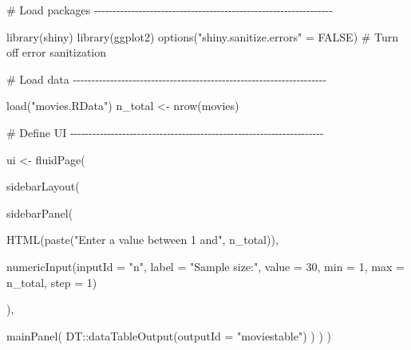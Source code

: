 \documentclass[
  letterpaper,
  DIV=11,
  numbers=noendperiod]{scrreprt}
\newenvironment{Shaded}{\begin{snugshade}}{\end{snugshade}}
\newcommand{\AttributeTok}[1]{\textcolor[rgb]{0.40,0.46,0.14}{#1}}
\newcommand{\CommentTok}[1]{\textcolor[rgb]{0.37,0.37,0.37}{#1}}
\newcommand{\ConstantTok}[1]{\textcolor[rgb]{0.56,0.35,0.01}{#1}}
\newcommand{\DecValTok}[1]{\textcolor[rgb]{0.68,0.00,0.00}{#1}}
\newcommand{\FunctionTok}[1]{\textcolor[rgb]{0.28,0.35,0.67}{#1}}
\newcommand{\NormalTok}[1]{\textcolor[rgb]{0.00,0.46,0.62}{#1}}
\newcommand{\OtherTok}[1]{\textcolor[rgb]{0.00,0.46,0.62}{#1}}
\newcommand{\SpecialCharTok}[1]{\textcolor[rgb]{0.37,0.37,0.37}{#1}}
\newcommand{\StringTok}[1]{\textcolor[rgb]{0.13,0.47,0.30}{#1}}
\begin{document}
\begin{Shaded}
\begin{Highlighting}[]
\CommentTok{\# Load packages {-}{-}{-}{-}{-}{-}{-}{-}{-}{-}{-}{-}{-}{-}{-}{-}{-}{-}{-}{-}{-}{-}{-}{-}{-}{-}{-}{-}{-}{-}{-}{-}{-}{-}{-}{-}{-}{-}{-}{-}{-}{-}{-}{-}{-}{-}{-}{-}{-}{-}{-}{-}{-}{-}{-}{-}{-}{-}{-}{-}{-}{-}{-}{-}}

\FunctionTok{library}\NormalTok{(shiny)}
\FunctionTok{library}\NormalTok{(ggplot2)}
\FunctionTok{options}\NormalTok{(}\StringTok{"shiny.sanitize.errors"} \OtherTok{=} \ConstantTok{FALSE}\NormalTok{) }\CommentTok{\# Turn off error sanitization}

\CommentTok{\# Load data {-}{-}{-}{-}{-}{-}{-}{-}{-}{-}{-}{-}{-}{-}{-}{-}{-}{-}{-}{-}{-}{-}{-}{-}{-}{-}{-}{-}{-}{-}{-}{-}{-}{-}{-}{-}{-}{-}{-}{-}{-}{-}{-}{-}{-}{-}{-}{-}{-}{-}{-}{-}{-}{-}{-}{-}{-}{-}{-}{-}{-}{-}{-}{-}{-}{-}{-}{-}}

\FunctionTok{load}\NormalTok{(}\StringTok{"movies.RData"}\NormalTok{)}
\NormalTok{n\_total }\OtherTok{\textless{}{-}} \FunctionTok{nrow}\NormalTok{(movies)}

\CommentTok{\# Define UI {-}{-}{-}{-}{-}{-}{-}{-}{-}{-}{-}{-}{-}{-}{-}{-}{-}{-}{-}{-}{-}{-}{-}{-}{-}{-}{-}{-}{-}{-}{-}{-}{-}{-}{-}{-}{-}{-}{-}{-}{-}{-}{-}{-}{-}{-}{-}{-}{-}{-}{-}{-}{-}{-}{-}{-}{-}{-}{-}{-}{-}{-}{-}{-}{-}{-}{-}{-}}

\NormalTok{ui }\OtherTok{\textless{}{-}} \FunctionTok{fluidPage}\NormalTok{(}
  
  \FunctionTok{sidebarLayout}\NormalTok{(}
    
    \FunctionTok{sidebarPanel}\NormalTok{(}
      
      \FunctionTok{HTML}\NormalTok{(}\FunctionTok{paste}\NormalTok{(}\StringTok{"Enter a value between 1 and"}\NormalTok{, n\_total)),}
      
      \FunctionTok{numericInput}\NormalTok{(}\AttributeTok{inputId =} \StringTok{"n"}\NormalTok{,}
                   \AttributeTok{label =} \StringTok{"Sample size:"}\NormalTok{,}
                   \AttributeTok{value =} \DecValTok{30}\NormalTok{,}
                   \AttributeTok{min =} \DecValTok{1}\NormalTok{, }\AttributeTok{max =}\NormalTok{ n\_total,}
                   \AttributeTok{step =} \DecValTok{1}\NormalTok{)}
      
\NormalTok{    ),}
    
    \FunctionTok{mainPanel}\NormalTok{(}
\NormalTok{      DT}\SpecialCharTok{::}\FunctionTok{dataTableOutput}\NormalTok{(}\AttributeTok{outputId =} \StringTok{"moviestable"}\NormalTok{)}
\NormalTok{    )}
\NormalTok{  )}
\NormalTok{)}


\end{Highlighting}
\end{Shaded}
\end{document}
